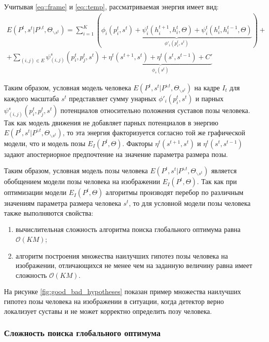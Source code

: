 Учитывая \eqref{eq::frame} и \eqref{eq::temp}, рассматриваемая энергия имеет вид:
\begin{multline}
	E(P^t, s^t| P^{\backslash t}, \Theta_{\backslash s^t}) =
	 \sum_{i=1}^K{
	 	\left(\underbrace{\phi_i(p_i^t, s^t) +
	 		 \psi_i^t(h_i^{t+1}, h_i^{t}, \Theta) +
	 		 \psi_i^t(h_i^{t}, h_i^{t-1}, \Theta)}_{\phi'_i(p_i^t, s^t)} \right)} + \\ +
 		  \sum_{\left(i,j\right)\in E}{
 		  	\psi_{(i,j)}^s(p_i^t, p_j^t, s^t)} +
 	  	  \underbrace{\eta^t(s^{t+1}, s^{t}) + \eta^t(s^{t}, s^{t-1}) + C'}_{\phi_s(s^t)}
\end{multline}

Таким образом, условная модель человека $E(P^t, s^t| P^{\backslash t}, \Theta_{\backslash s^t})$ на кадре $I_t$ для каждого масштаба $s^t$ представляет сумму унарных $\phi'_i(p_i^t, s^t)$ и парных $\psi^s_{(i,j)}(p_i^t, p_j^t, s^t)$ потенциалов относительно положения суставов позы человека. Так как модель движения не добавляет парных потенциалов в энергию $E(P^t, s^t| P^{\backslash t}, \Theta_{\backslash s^t})$, то эта энергия факторизуется согласно той же графической модели, что и модель позы $E_I(P^t, \Theta)$. Факторы $\eta^t(s^{t+1}, s^t)$ и $\eta^t(s^t, s^{t-1})$ задают апостериорное предпочтение на значение параметра размера позы.

Таким образом, условная модель позы человека $E(P^t, s^t| P^{\backslash t}, \Theta_{\backslash s^t})$ является обобщением модели позы человека на изображении $E_I(P^t, \Theta)$. Так как при оптимизации модели $E_I(P^t, \Theta)$ алгоритмы производят перебор по различным значениям параметра размера человека $s^t$, то для условной модели позы человека также выполняются свойства:
\begin{enumerate}
	\item вычислительная сложность алгоритма поиска глобального оптимума равна $\mathcal{O}(KM)$;
	\item алгоритм построения множества наилучших гипотез позы человека на изображении, отличающихся не менее чем на заданную величину равна имеет сложность $\mathcal{O}(KM)$.
\end{enumerate}

На рисунке \ref{fig:good_bad_hypotheses} показан пример множества наилучших гипотез позы человека на изображении в ситуации, когда детектор верно локализует суставы и не может корректно определить позу человека.

\subsubsection{Сложность поиска глобального оптимума}

